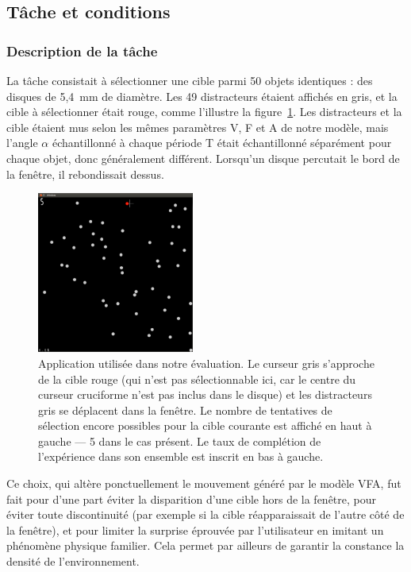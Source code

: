 	\subsection{Tâche et conditions}
	\subsubsection{Description de la tâche}
	La tâche consistait à sélectionner une cible parmi 50 objets identiques : des disques de 5,4~mm de diamètre. Les 49 \og distracteurs \fg{} étaient affichés en gris, et la cible à sélectionner était rouge, comme l'illustre la figure~\ref{fig:app}. Les distracteurs et la cible étaient mus selon les mêmes paramètres V, F et A de notre modèle, mais l'angle $\alpha$ échantillonné à chaque période T était échantillonné séparément pour chaque objet, donc généralement différent. Lorsqu'un disque \og percutait \fg{} le bord de la fenêtre, il \og rebondissait \fg{} dessus.
	
	\begin{figure} %
		\centering
		\includegraphics[width=0.46\textwidth]{figures/ch4/app}
		\caption[Application utilisée dans notre évaluation]{Application utilisée dans notre évaluation. Le curseur gris s'approche de la cible rouge (qui n'est pas sélectionnable ici, car le centre du curseur cruciforme n'est pas inclus dans le disque) et les distracteurs gris se déplacent dans la fenêtre. Le nombre de tentatives de sélection encore possibles pour la cible courante est affiché en haut à gauche --- 5 dans le cas présent. Le taux de complétion de l'expérience dans son ensemble est inscrit en bas à gauche.}
		\label{fig:app}
	\end{figure}
	
	Ce choix, qui altère ponctuellement le mouvement généré par le modèle VFA, fut fait pour d'une part éviter la disparition d'une cible hors de la fenêtre, pour éviter toute discontinuité (par exemple si la cible réapparaissait de l'autre côté de la fenêtre), et pour limiter la \og surprise \fg{} éprouvée par l'utilisateur en imitant un phénomène physique familier. Cela permet par ailleurs de garantir la constance la densité de l'environnement.
	
